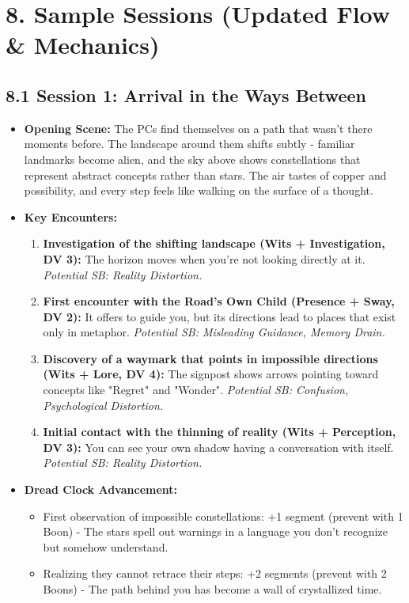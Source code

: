 \documentclass[11pt]{article}
\begin{document}
\section*{8. Sample Sessions (Updated Flow \& Mechanics)}

\subsection*{8.1 Session 1: Arrival in the Ways Between}

\begin{itemize}
\item \textbf{Opening Scene:} The PCs find themselves on a path that wasn't there moments before. The landscape around them shifts subtly - familiar landmarks become alien, and the sky above shows constellations that represent abstract concepts rather than stars. The air tastes of copper and possibility, and every step feels like walking on the surface of a thought.
\item \textbf{Key Encounters:}
\begin{enumerate}
\item \textbf{Investigation of the shifting landscape (Wits + Investigation, DV 3):} The horizon moves when you're not looking directly at it. \textit{Potential SB: Reality Distortion.}
\item \textbf{First encounter with the Road's Own Child (Presence + Sway, DV 2):} It offers to guide you, but its directions lead to places that exist only in metaphor. \textit{Potential SB: Misleading Guidance, Memory Drain.}
\item \textbf{Discovery of a waymark that points in impossible directions (Wits + Lore, DV 4):} The signpost shows arrows pointing toward concepts like "Regret" and "Wonder". \textit{Potential SB: Confusion, Psychological Distortion.}
\item \textbf{Initial contact with the thinning of reality (Wits + Perception, DV 3):} You can see your own shadow having a conversation with itself. \textit{Potential SB: Reality Distortion.}
\end{enumerate}
\item \textbf{Dread Clock Advancement:}
\begin{itemize}
\item First observation of impossible constellations: +1 segment (prevent with 1 Boon) - The stars spell out warnings in a language you don't recognize but somehow understand.
\item Realizing they cannot retrace their steps: +2 segments (prevent with 2 Boons) - The path behind you has become a wall of crystallized time.

\end{itemize}
\end{itemize}
\end{document}
